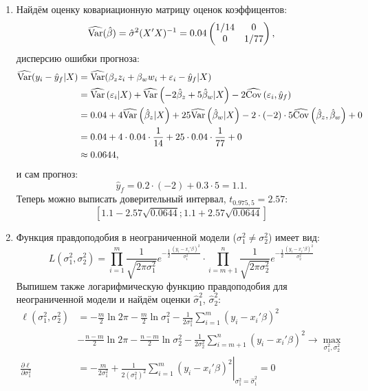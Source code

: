 \begin{enumerate}
\item Найдём оценку ковариационную матрицу оценок коэффицентов:
\[
\widehat {\operatorname{Var}}(\hat \beta) = \hat \sigma^2 (X'X)^{-1} = 0.04
\begin{pmatrix}
1/14 & 0 \\
0 & 1/77
\end{pmatrix},
\]
дисперсию ошибки прогноза:
\begin{align*}
\widehat {\operatorname{Var}}(y_i - \hat y_f | X) &=  \widehat{\operatorname{Var}}(\beta_z z_i + \beta_w w_i + \varepsilon_i - \hat y_f | X) \\
&= \widehat{\operatorname{Var}}\left(\varepsilon_i | X\right) + \widehat {\operatorname{Var}}\left(-2 \hat \beta_z + 5 \hat \beta_w  | X \right) - 2 \widehat {\operatorname{Cov}}\left(\varepsilon_i, \hat y_f\right) \\
&= 0.04 + 4 \widehat {\operatorname{Var}}\left(\hat \beta_z | X\right) + 25 \widehat {\operatorname{Var}}\left(\hat \beta_w | X\right) - 2 \cdot (-2) \cdot 5 \widehat {\operatorname{Cov}}\left(\hat \beta_z, \hat \beta_w\right) + 0 \\
&= 0.04 + 4 \cdot 0.04 \cdot \frac{1}{14} + 25 \cdot 0.04 \cdot \frac{1}{77} + 0 \\
&\approx 0.0644,
\end{align*}
и сам прогноз:
\[
\hat y_f = 0.2 \cdot (-2) + 0.3 \cdot 5 = 1.1.
\]
Теперь можно выписать доверительный интервал, $t_{0.975, 5} = 2.57$:
\[
\left[1.1 - 2.57 \sqrt{0.0644}; 1.1 + 2.57 \sqrt{0.0644}\right]
\]
\item Функция правдоподобия в неограниченной модели ($\sigma^2_1 \neq \sigma^2_2$)
имеет вид:
\[
L\left(\sigma^2_1, \sigma^2_2\right) = \prod_{i=1}^m \frac{1}{\sqrt{2\pi\sigma^2_1}} e^{-\frac{1}{2}\frac{\left(y_i - x_i'\beta\right)^2}{\sigma^2_1}}
\cdot \prod_{i=m+1}^n \frac{1}{\sqrt{2\pi\sigma^2_2}} e^{-\frac{1}{2}\frac{\left(y_i - x_i'\beta\right)^2}{\sigma^2_2}}
\]
Выпишем также логарифмическую функцию правдоподобия для неограниченной модели
и найдём оценки $\hat \sigma^2_1$, $\hat \sigma^2_2$:
\begin{align*}
\ell\left(\sigma^2_1, \sigma^2_2\right) &= -\frac{m}{2} \ln 2\pi - \frac{m}{2} \ln \sigma^2_1 -
\frac{1}{2\sigma^2_1} \sum_{i=1}^m \left(y_i - x_i'\beta\right)^2 \\
&- \frac{n-m}{2} \ln 2\pi - \frac{n-m}{2} \ln \sigma^2_2 -
\frac{1}{2\sigma^2_2} \sum_{i=m+1}^n \left(y_i - x_i' \beta\right)^2 \to \max_{\sigma^2_1, \sigma^2_2} \\
\frac{\partial \ell}{\partial \sigma^2_1} &= \left. -\frac{m}{2\sigma^2_1} + \frac{1}{2\left(\sigma^2_1\right)^2} \sum_{i=1}^m \left(y_i - x_i'\beta\right)^2 \right|_{\sigma^2_1 = \hat\sigma^2_1} = 0 \\

\end{align*}
\end{enumerate}
